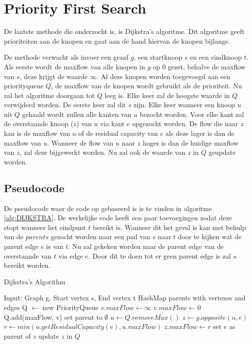 \chapter{Priority First Search}
\label{chap:priorityfirst}

De laatste methode die onderzocht is, is Dijkstra's algoritme. Dit algoritme geeft prioriteiten aan de knopen en gaat aan de hand hiervan de knopen bijlangs.

De methode verwacht als invoer een graaf $g$, een startknoop $s$ en een eindknoop $t$.
Als eerste wordt de maxflow van alle knopen in $g$ op 0 gezet, behalve de maxflow van $s$, deze krijgt de waarde $\infty$. Al deze knopen worden toegevoegd aan een priorityqueue $Q$, de maxflow van de knopen wordt gebruikt als de prioriteit.
Nu zal het algoritme doorgaan tot $Q$ leeg is. Elke keer zal de hoogste waarde in $Q$ verwijderd worden. De eerste keer zal dit $s$ zijn. Elke keer wanneer een knoop $u$ uit $Q$ gehaald wordt zullen alle kanten van $u$ bezocht worden. Voor elke kant zal de overstaande knoop ($z$) van $u$ via kant $e$ opgezocht worden. De flow die naar $z$ kan is de maxflow van $u$ of de residual capacity van $e$ als deze lager is dan de maxflow van $u$. Wanneer de flow van $u$ naar $z$ hoger is dan de huidige maxflow van $z$, zal deze bijgewerkt worden. Nu zal ook de waarde van $z$ in $Q$ geupdate worden.

\section{Pseudocode}
De pseudocode waar de code op gebaseerd is is te vinden in algoritme \ref{alg:DIJKSTRA}.
De werkelijke code heeft een paar toevoegingen zodat deze stopt wanneer het eindpunt $t$ bereikt is. Wanneer dit het geval is kan met behulp van de $parents$ gezocht worden naar een pad van $s$ naar $t$ door te kijken wat de parent edge $e$ is van $t$. Nu zal gekeken worden naar de parent edge van de overstaande van $t$ via edge $e$. Door dit te doen tot er geen parent edge is zal $s$ bereikt worden.

\begin{algorithm}[h]
\caption{Dijkstra's Algorithm}
\label{alg:DIJKSTRA}
\begin{algorithmic}
\REQUIRE Input: Graph g, Start vertex s, End vertex t
\STATE HashMap parents with vertexes and edges
\STATE Q $\gets$ new PriorityQueue
\STATE $v.maxFlow \gets \infty$
\ELSE
\STATE $v.maxFlow \gets 0$
\ENDIF
\STATE Q.add(maxFlow, v)
\STATE set parent to $\emptyset$
\ENDFOR
{}
\STATE $u \gets Q.removeMax()$
\STATE $z \gets g.opposite(u, e)$
\STATE $r \gets min(u.getResidualCapacity(e), u.maxFlow)$
\STATE $z.maxFlow \gets r$
\STATE set $e$ as parent of $z$
\STATE update $z$ in $Q$
\ENDIF
\ENDFOR
\ENDWHILE
\end{algorithmic}
\end{algorithm}


